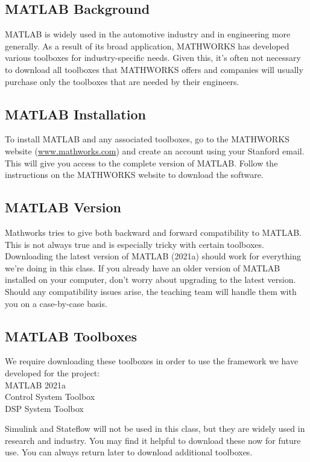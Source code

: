 

\subsection*{MATLAB Background}

MATLAB is widely used in the automotive industry and in engineering more generally.  As a result of its broad application, MATHWORKS has developed various toolboxes for industry-specific needs.  Given this, it's often not necessary to download all toolboxes that MATHWORKS offers and companies will usually purchase only the toolboxes that are needed by their engineers.  

\subsection*{MATLAB Installation}
To install MATLAB and any associated toolboxes, go to the MATHWORKS website (\url{www.mathworks.com}) and create an account using your Stanford email. This will give you access to the complete version of MATLAB. Follow the instructions on the MATHWORKS website to download the software.


\subsection*{MATLAB Version}
Mathworks tries to give both backward and forward compatibility to MATLAB.  This is not always true and is especially tricky with certain toolboxes.  Downloading the latest version of MATLAB (2021a) should work for everything we're doing in this class.  If you already have an older version of MATLAB installed on your computer, don't worry about upgrading to the latest version.  Should any compatibility issues arise, the teaching team will handle them with you on a case-by-case basis.

\subsection*{MATLAB Toolboxes}
We require downloading these toolboxes in order to use the framework we have developed for the project:
\\MATLAB 2021a
\\Control System Toolbox
\\DSP System Toolbox

Simulink and Stateflow will not be used in this class, but they are widely used in research and industry.  You may find it helpful to download these now for future use.  You can always return later to download additional toolboxes.
